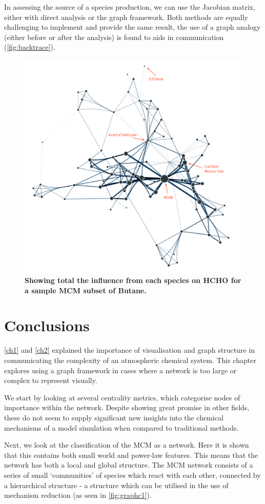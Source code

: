 In assessing the source of a species production, we can use the Jacobian matrix, either with direct analysis or the graph framework. Both methods are equally challenging to implement and provide the same result, the use of a graph analogy (either before or after the analysis) is found to aids in communication (\autoref{fig:backtrace}).



\begin{figure}[H]
     \centering
     \includegraphics[width=.7\textwidth]{figures_c3/ch2_distance.pdf}
        \caption{\textbf{Showing total the influence from each species on HCHO for a sample MCM subset of Butane.}  }
        \label{fig:backtrace}
\end{figure}


\section{Conclusions}

\autoref{ch1} and \autoref{ch2} explained the importance of visualisation and graph structure in communicating the complexity of an atmospheric chemical system. This chapter explores using a graph framework in cases where a network is too large or complex to represent visually.

We start by looking at several centrality metrics, which categorise nodes of importance within the network. Despite showing great promise in other fields, these do not seem to supply significant new insights into the chemical mechanisms of a model simulation when compared to traditional methods.

Next, we look at the classification of the MCM as a network. Here it is shown that this contains both small world and power-law features. This means that the network has both a local and global structure. The MCM network consists of a series of small `communities' of species which react with each other, connected by a hierarchical structure - a structure which can be utilised in the use of mechanism reduction (as seen in \autoref{fig:graphc1}).


